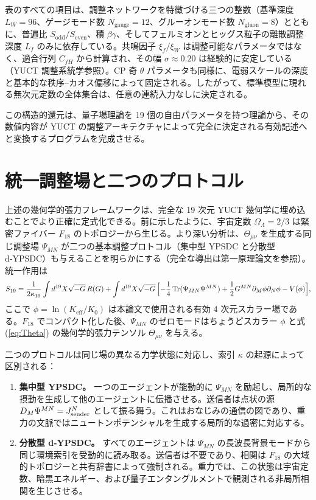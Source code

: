 \documentclass[12pt,a4paper]{article}
\DeclareMathOperator{\Tr}{Tr}
\begin{document}
	表のすべての項目は、調整ネットワークを特徴づける三つの整数（基準深度 \(L_W=96\)、ゲージモード数 \(N_{\mathrm{gauge}}=12\)、グルーオンモード数 \(N_{\mathrm{gluon}}=8\)）とともに、普遍比 \(S_{\mathrm{odd}}/S_{\mathrm{even}}\)、積 \(\beta\gamma\)、そしてフェルミオンとヒッグス粒子の離散調整深度 \(L_f\) のみに依存している。共鳴因子 \(\xi_f/\xi_W\) は調整可能なパラメータではなく、適合行列 \(C_{fH}\) から計算され、その幅 \(\sigma \approx 0.20\) は経験的に安定している（YUCT 調整系統学参照）。CP 奇 \(\theta\) パラメータも同様に、電弱スケールの深度と基本的な秩序–カオス偏移によって固定される。したがって、標準模型に現れる無次元定数の全体集合は、任意の連続入力なしに決定される。
	
	この構造的還元は、量子場理論を 19 個の自由パラメータを持つ理論から、その数値内容が YUCT の調整アーキテクチャによって完全に決定される有効記述へと変換するプログラムを完成させる。
	
	\section{統一調整場と二つのプロトコル}
	\label{sec:unified-protocols}
	
	上述の幾何学的張力フレームワークは、完全な 19 次元 YUCT 幾何学に埋め込むことでより正確に定式化できる。前に示したように、宇宙定数 \(\Omega_\Lambda=2/3\) は緊密ファイバー \(F_{18}\) のトポロジーから生じる。より深い分析は、\(\Theta_{\mu\nu}\) を生成する同じ調整場 \(\Psi_{MN}\) が二つの基本調整プロトコル（集中型 YPSDC と分散型 d‑YPSDC）も与えることを明らかにする（完全な導出は第一原理論文を参照）。統一作用は
	\begin{equation}
		S_{19} = \frac{1}{2\kappa_{19}} \int d^{19}X \sqrt{-G}\, R(G)
		+ \int d^{19}X \sqrt{-G}\,
		\Bigl[ -\frac14 \Tr(\Psi_{MN}\Psi^{MN})
		+ \frac12 G^{MN}\partial_M\phi \partial_N\phi
		- V(\phi) \Bigr],
		\label{eq:unified-gravity}
	\end{equation}
	ここで \(\phi = \ln(K_{\mathrm{eff}}/K_0)\) は本論文で使用される有効 4 次元スカラー場である。\(F_{18}\) でコンパクト化した後、\(\Psi_{MN}\) のゼロモードはちょうどスカラー \(\phi\) と式 (\ref{eq:Theta}) の幾何学的張力テンソル \(\Theta_{\mu\nu}\) を与える。
	
	二つのプロトコルは同じ場の異なる力学状態に対応し、索引 \(\kappa\) の起源によって区別される：
	\begin{enumerate}[leftmargin=*]
		\item \textbf{集中型 YPSDC。} 一つのエージェントが能動的に \(\Psi_{MN}\) を励起し、局所的な摂動を生成して他のエージェントに伝播させる。送信者は点状の源 \(D_M\Psi^{MN} = J^N_{\rm sender}\) として振る舞う。これはおなじみの通信の図であり、重力の文脈ではニュートンポテンシャルを生成する局所的な過密に対応する。
		\item \textbf{分散型 d‑YPSDC。} すべてのエージェントは \(\Psi_{MN}\) の長波長背景モードから同じ環境索引を受動的に読み取る。送信者は不要であり、相関は \(F_{18}\) の大域的トポロジーと共有辞書によって強制される。重力では、この状態は宇宙定数、暗黒エネルギー、および量子エンタングルメントで観測される非局所相関を生じさせる。
	\end{enumerate}
	
\end{document}
